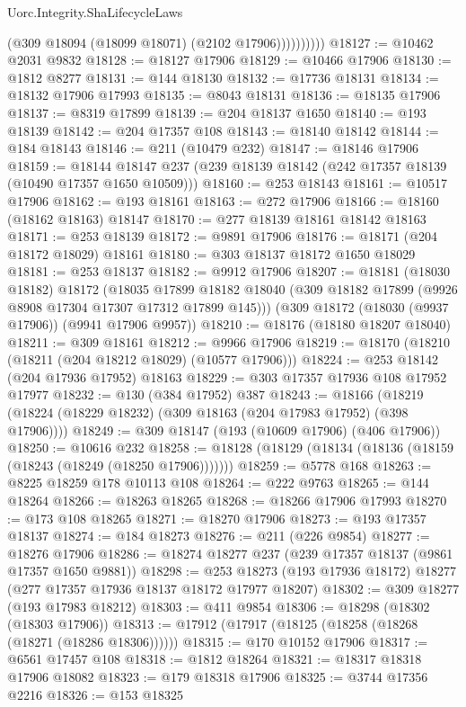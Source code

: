 \begin{lexlean}{Uorc.Integrity.ShaLifecycleLaws}
\begin{coremodule}
                    (@309 @18094 (@18099 @18071) (@2102 @17906))))))))))
@18127 := @10462 @2031 @9832
@18128 := @18127 @17906
@18129 := @10466 @17906
@18130 := @1812 @8277
@18131 := @144 @18130
@18132 := @17736 @18131
@18134 := @18132 @17906 @17993
@18135 := @8043 @18131
@18136 := @18135 @17906
@18137 := @8319 @17899
@18139 := @204 @18137 @1650
@18140 := @193 @18139
@18142 := @204 @17357 @108
@18143 := @18140 @18142
@18144 := @184 @18143
@18146 := @211 (@10479 @232)
@18147 := @18146 @17906
@18159 := @18144 @18147 @237 (@239 @18139 @18142 (@242 @17357 @18139 (@10490 @17357 @1650 @10509)))
@18160 := @253 @18143
@18161 := @10517 @17906
@18162 := @193 @18161
@18163 := @272 @17906
@18166 := @18160 (@18162 @18163) @18147
@18170 := @277 @18139 @18161 @18142 @18163
@18171 := @253 @18139
@18172 := @9891 @17906
@18176 := @18171 (@204 @18172 @18029) @18161
@18180 := @303 @18137 @18172 @1650 @18029
@18181 := @253 @18137
@18182 := @9912 @17906
@18207 := @18181
    (@18030 @18182)
    @18172
    (@18035
      @17899
      @18182
      @18040
      (@309 @18182 @17899 (@9926 @8908 @17304 @17307 @17312 @17899 @145)))
    (@309 @18172 (@18030 (@9937 @17906)) (@9941 @17906 @9957))
@18210 := @18176 (@18180 @18207 @18040)
@18211 := @309 @18161
@18212 := @9966 @17906
@18219 := @18170 (@18210 (@18211 (@204 @18212 @18029) (@10577 @17906)))
@18224 := @253 @18142 (@204 @17936 @17952) @18163
@18229 := @303 @17357 @17936 @108 @17952 @17977
@18232 := @130 (@384 @17952) @387
@18243 := @18166 (@18219 (@18224 (@18229 @18232) (@309 @18163 (@204 @17983 @17952) (@398 @17906))))
@18249 := @309 @18147 (@193 (@10609 @17906) (@406 @17906))
@18250 := @10616 @232
@18258 := @18128 (@18129 (@18134 (@18136 (@18159 (@18243 (@18249 (@18250 @17906)))))))
@18259 := @5778 @168
@18263 := @8225 @18259 @178 @10113 @108
@18264 := @222 @9763
@18265 := @144 @18264
@18266 := @18263 @18265
@18268 := @18266 @17906 @17993
@18270 := @173 @108 @18265
@18271 := @18270 @17906
@18273 := @193 @17357 @18137
@18274 := @184 @18273
@18276 := @211 (@226 @9854)
@18277 := @18276 @17906
@18286 := @18274 @18277 @237 (@239 @17357 @18137 (@9861 @17357 @1650 @9881))
@18298 := @253 @18273 (@193 @17936 @18172) @18277 (@277 @17357 @17936 @18137 @18172 @17977 @18207)
@18302 := @309 @18277 (@193 @17983 @18212)
@18303 := @411 @9854
@18306 := @18298 (@18302 (@18303 @17906))
@18313 := @17912 (@17917 (@18125 (@18258 (@18268 (@18271 (@18286 @18306))))))
@18315 := @170 @10152 @17906
@18317 := @6561 @17457 @108
@18318 := @1812 @18264
@18321 := @18317 @18318 @17906 @18082
@18323 := @179 @18318 @17906
@18325 := @3744 @17356 @2216
@18326 := @153 @18325

\end{coremodule}
\end{lexlean}
